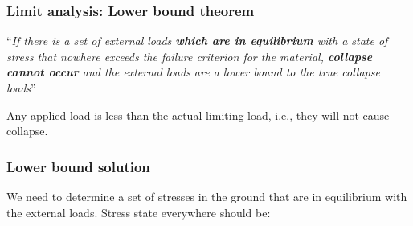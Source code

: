 \documentclass[notes]{beamer}
\begin{document}
\begin{frame}
	\frametitle{Limit analysis: Lower bound theorem}
	
	``\textit{If there is a set of external loads \textbf{which are in equilibrium} with a state of
 stress that nowhere exceeds the failure criterion for the material, \textbf{collapse cannot occur} and the external loads are a lower bound to the true
	collapse loads}''\\
	\vspace{1em}
	
	Any applied load is less than the actual limiting load, i.e., they will not cause collapse.\\
	\mode<handout>{
	\vspace{5cm}
	}
\end{frame}

\begin{frame}
	\frametitle{Lower bound solution}
	We need to determine a set of
stresses in the ground that are in equilibrium with the external
loads. Stress state everywhere should be:
	\mode<handout>{
		\vspace{5cm}
	}
\end{frame}
\end{document}
